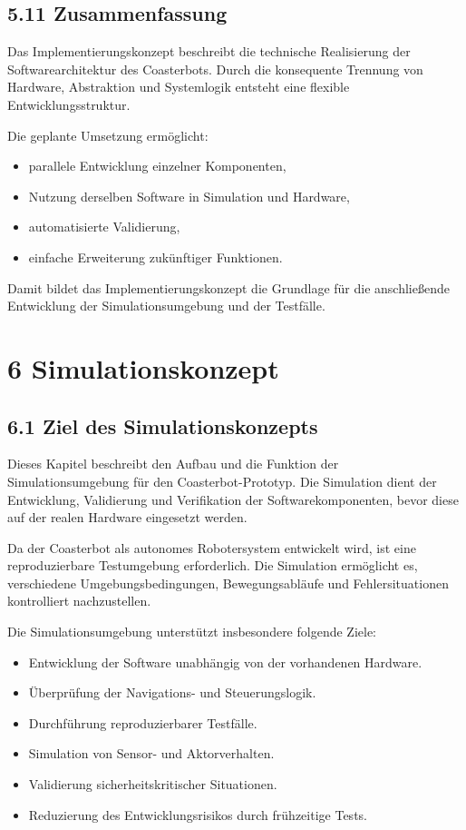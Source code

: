 \documentclass[
  a4paper,
  12pt,
  DIV=12,        %
  parskip=half,  %
  headings=small %
]{scrartcl}
\theoremstyle{definition}
\providecommand{\tightlist}{%
  \setlength{\itemsep}{0pt}\setlength{\parskip}{0pt}}
\theoremstyle{definition}
\providecommand{\tightlist}{%
  \setlength{\itemsep}{0pt}\setlength{\parskip}{0pt}}
\begin{document}
\subsection{5.11 Zusammenfassung}\label{zusammenfassung-3}

Das Implementierungskonzept beschreibt die technische Realisierung der
Softwarearchitektur des Coasterbots. Durch die konsequente Trennung von
Hardware, Abstraktion und Systemlogik entsteht eine flexible
Entwicklungsstruktur.

Die geplante Umsetzung ermöglicht:

\begin{itemize}
\tightlist
\item
  parallele Entwicklung einzelner Komponenten,
\item
  Nutzung derselben Software in Simulation und Hardware,
\item
  automatisierte Validierung,
\item
  einfache Erweiterung zukünftiger Funktionen.
\end{itemize}

Damit bildet das Implementierungskonzept die Grundlage für die
anschließende Entwicklung der Simulationsumgebung und der Testfälle.

\section{6 Simulationskonzept}\label{simulationskonzept}

\subsection{6.1 Ziel des
Simulationskonzepts}\label{ziel-des-simulationskonzepts}

Dieses Kapitel beschreibt den Aufbau und die Funktion der
Simulationsumgebung für den Coasterbot-Prototyp. Die Simulation dient
der Entwicklung, Validierung und Verifikation der Softwarekomponenten,
bevor diese auf der realen Hardware eingesetzt werden.

Da der Coasterbot als autonomes Robotersystem entwickelt wird, ist eine
reproduzierbare Testumgebung erforderlich. Die Simulation ermöglicht es,
verschiedene Umgebungsbedingungen, Bewegungsabläufe und
Fehlersituationen kontrolliert nachzustellen.

Die Simulationsumgebung unterstützt insbesondere folgende Ziele:

\begin{itemize}
\tightlist
\item
  Entwicklung der Software unabhängig von der vorhandenen Hardware.
\item
  Überprüfung der Navigations- und Steuerungslogik.
\item
  Durchführung reproduzierbarer Testfälle.
\item
  Simulation von Sensor- und Aktorverhalten.
\item
  Validierung sicherheitskritischer Situationen.
\item
  Reduzierung des Entwicklungsrisikos durch frühzeitige Tests.
\end{itemize}
\end{document}
